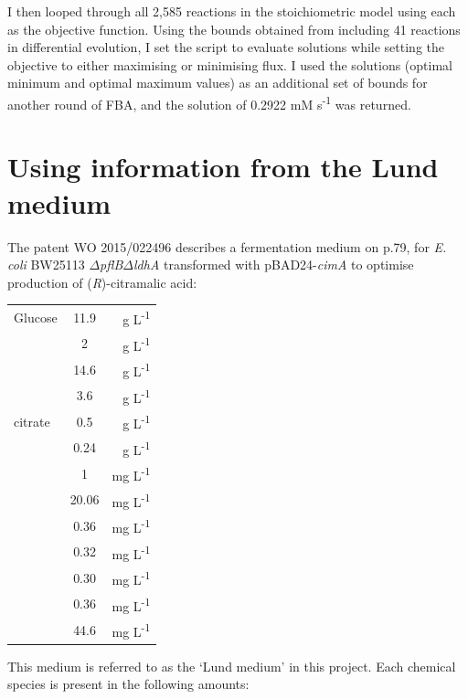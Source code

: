 \documentclass[parskip=full, numbers=noenddot]{scrreprt}
\begin{document}
I then looped through all 2,585 reactions in the stoichiometric model using each as the objective function. Using the bounds obtained from including 41 reactions in differential evolution, I set the script to evaluate solutions while setting the objective to either maximising or minimising flux. I used the solutions (optimal minimum and optimal maximum values) as an additional set of bounds for another round of FBA, and the solution of 0.2922 mM s\textsuperscript{-1} was returned.

\section{Using information from the Lund medium}
\label{sec:lund}

The patent WO 2015/022496 \citep{eastham_process_2015} describes a fermentation medium on p.79, for \emph{E. coli} BW25113 $\Delta$\emph{pflB}$\Delta$\emph{ldhA} transformed with pBAD24-\emph{cimA} to optimise production of (\emph{R})-citramalic acid:

\begin{tabular}{lSr}
  Glucose & 11.9 & g L\textsuperscript{-1}\\
   & 2 & g L\textsuperscript{-1}\\
   & 14.6 & g L\textsuperscript{-1}\\
   & 3.6 & g L\textsuperscript{-1}\\
   citrate & 0.5 & g L\textsuperscript{-1}\\
   & 0.24 & g L\textsuperscript{-1}\\
   & 1 & mg L\textsuperscript{-1}\\
   & 20.06 & mg L\textsuperscript{-1}\\
   & 0.36 & mg L\textsuperscript{-1}\\
   & 0.32 & mg L\textsuperscript{-1}\\
   & 0.30 & mg L\textsuperscript{-1}\\
   & 0.36 & mg L\textsuperscript{-1}\\
   & 44.6 & mg L\textsuperscript{-1}
\end{tabular}

This medium is referred to as the `Lund medium' in this project. Each chemical species is present in the following amounts:
\end{document}
